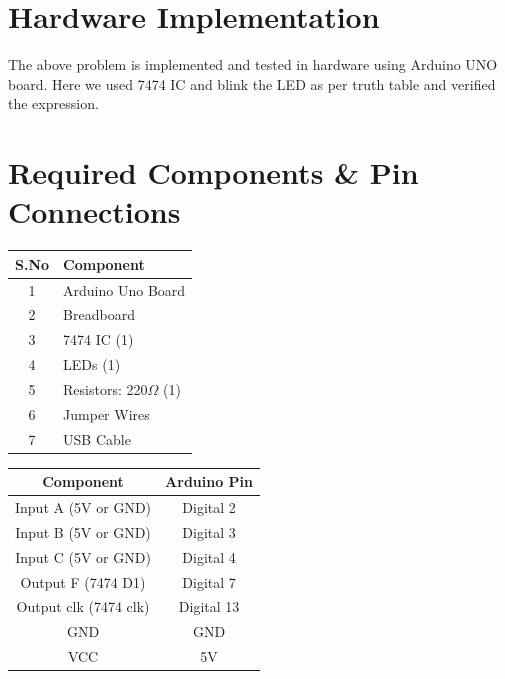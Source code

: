 \documentclass[a4paper,12pt]{article}
\begin{document}
\section*{\textbf{Hardware Implementation}}
The above problem is implemented and tested in hardware using Arduino UNO board. Here we used 7474 IC and blink the LED  as per truth table and verified the expression.
\section*{Required Components \& Pin Connections}
\begin{center}
\begin{minipage}{0.45\textwidth}
\begin{table}[H]
\centering
\begin{tabular}{|c|l|}
\hline
\textbf{S.No} & \textbf{Component} \\ \hline
1 & Arduino Uno Board \\
2 & Breadboard \\
3 & 7474 IC (1) \\
4 & LEDs (1) \\
5 & Resistors: 220$\Omega$ (1) \\
6 & Jumper Wires \\
7 & USB Cable \\
\hline
\end{tabular}
\end{table}
\end{minipage}
\hspace{0.05\textwidth}
\begin{minipage}{0.45\textwidth}
\begin{table}[H]
\centering
\begin{tabular}{|c|c|}
\hline
\textbf{Component} & \textbf{Arduino Pin} \\ \hline
Input A (5V or GND) & Digital 2 \\
Input B (5V or GND) & Digital 3 \\
Input C (5V or GND) & Digital 4 \\
Output F (7474 D1) & Digital 7 \\
Output clk (7474 clk) & Digital 13 \\
GND & GND \\
VCC & 5V \\
\hline
\end{tabular}
\end{table}
\end{minipage}
\end{center}
\end{document}
